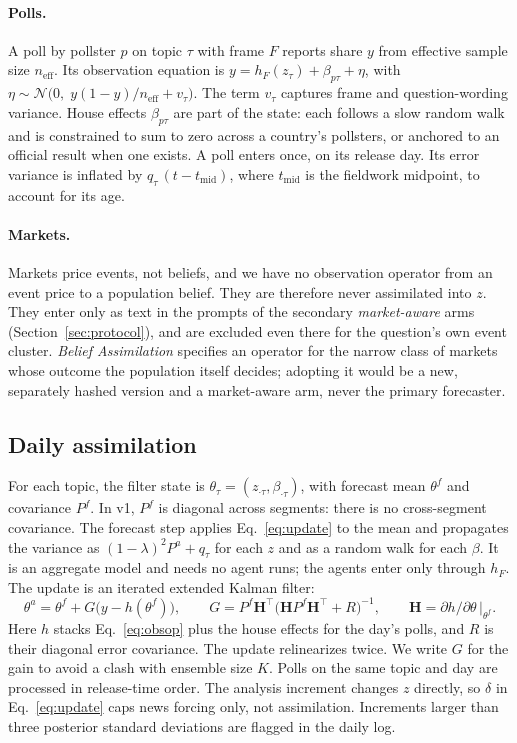 \documentclass[11pt]{article}
\begin{document}
\paragraph{Polls.} A poll by pollster $p$ on topic $\tau$ with frame $F$ reports share $y$ from effective sample size $n_{\mathrm{eff}}$. Its observation equation is $y = h_F(z_\tau) + \beta_{p\tau} + \eta$, with $\eta\sim\mathcal{N}\big(0,\;y(1-y)/n_{\mathrm{eff}} + v_\tau\big)$. The term $v_\tau$ captures frame and question-wording variance. House effects $\beta_{p\tau}$ are part of the state: each follows a slow random walk and is constrained to sum to zero across a country's pollsters, or anchored to an official result when one exists. A poll enters once, on its release day. Its error variance is inflated by $q_\tau\,(t-t_{\mathrm{mid}})$, where $t_{\mathrm{mid}}$ is the fieldwork midpoint, to account for its age.

\paragraph{Markets.} Markets price events, not beliefs, and we have no observation operator from an event price to a population belief. They are therefore never assimilated into $z$. They enter only as text in the prompts of the secondary \emph{market-aware} arms (Section~\ref{sec:protocol}), and are excluded even there for the question's own event cluster. \emph{Belief Assimilation} specifies an operator for the narrow class of markets whose outcome the population itself decides; adopting it would be a new, separately hashed version and a market-aware arm, never the primary forecaster.

\subsection{Daily assimilation}\label{sec:da}
For each topic, the filter state is $\theta_\tau=(z_{\cdot\tau},\beta_{\cdot\tau})$, with forecast mean $\theta^f$ and covariance $P^f$. In v1, $P^f$ is diagonal across segments: there is no cross-segment covariance. The forecast step applies Eq.~\eqref{eq:update} to the mean and propagates the variance as $(1-\lambda)^2P^a+q_\tau$ for each $z$ and as a random walk for each $\beta$. It is an aggregate model and needs no agent runs; the agents enter only through $h_F$. The update is an iterated extended Kalman filter:
\begin{equation}\label{eq:kf}
\theta^{a} = \theta^{f} + G\big(y - h(\theta^{f})\big),\qquad G = P^{f} \mathbf{H}^{\top}\big(\mathbf{H} P^{f} \mathbf{H}^{\top}+R\big)^{-1},\qquad \mathbf{H}=\partial h/\partial\theta\,\big|_{\theta^f}.
\end{equation}
Here $h$ stacks Eq.~\eqref{eq:obsop} plus the house effects for the day's polls, and $R$ is their diagonal error covariance. The update relinearizes twice. We write $G$ for the gain to avoid a clash with ensemble size $K$. Polls on the same topic and day are processed in release-time order. The analysis increment changes $z$ directly, so $\delta$ in Eq.~\eqref{eq:update} caps news forcing only, not assimilation. Increments larger than three posterior standard deviations are flagged in the daily log.
\end{document}
